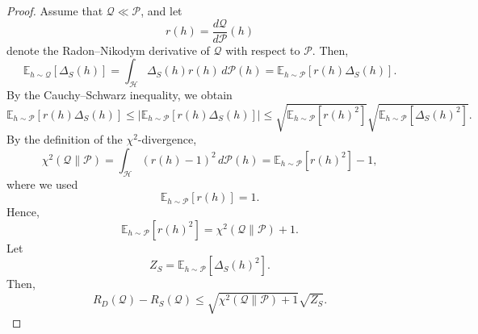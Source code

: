 \documentclass[10pt,a4paper]{amsart}
\begin{document}
\begin{proof}
Assume that $\mathcal Q\ll \mathcal P$, and let
\begin{equation}
r(h)=\frac{d\mathcal Q}{d\mathcal P}(h)
\end{equation}
denote the Radon--Nikodym derivative of $\mathcal Q$ with respect to $\mathcal P$. Then,
\begin{equation}
\mathbb E_{h\sim\mathcal Q}[\Delta_S(h)]
=
\int_{\mathcal H}\Delta_S(h)r(h)\,d\mathcal P(h)
=
\mathbb E_{h\sim\mathcal P}[r(h)\Delta_S(h)].
\end{equation}
By the Cauchy--Schwarz inequality, we obtain
\begin{equation}
\mathbb E_{h\sim\mathcal P}[r(h)\Delta_S(h)]
\le
\left|
\mathbb E_{h\sim\mathcal P}[r(h)\Delta_S(h)]
\right|
\le
\sqrt{\mathbb E_{h\sim\mathcal P}[r(h)^2]}
\sqrt{\mathbb E_{h\sim\mathcal P}[\Delta_S(h)^2]}.
\end{equation}
By the definition of the $\chi^2$-divergence,
\begin{equation}
\chi^2(\mathcal Q\|\mathcal P)
=
\int_{\mathcal H}(r(h)-1)^2\,d\mathcal P(h)
=
\mathbb E_{h\sim\mathcal P}[r(h)^2]-1,
\end{equation}
where we used
\begin{equation}
\mathbb E_{h\sim\mathcal P}[r(h)]=1.
\end{equation}
Hence,
\begin{equation}
\mathbb E_{h\sim\mathcal P}[r(h)^2]
=
\chi^2(\mathcal Q\|\mathcal P)+1.
\end{equation}
Let
\begin{equation}
Z_S
=
\mathbb E_{h\sim\mathcal P}[\Delta_S(h)^2].
\end{equation}
Then,
\begin{equation}
R_D(\mathcal Q)-R_S(\mathcal Q)
\le
\sqrt{\chi^2(\mathcal Q\|\mathcal P)+1}
\sqrt{Z_S}.
\end{equation}


\end{proof}
\end{document}
